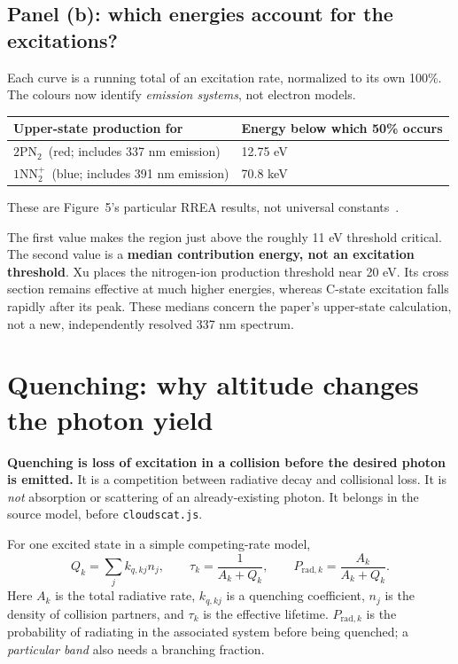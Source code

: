 \documentclass[11pt,a4paper]{article}
\newcommand{\TwoP}{\ensuremath{2\mathrm{P}\mathrm{N}_2}}
\newcommand{\OneN}{\ensuremath{1\mathrm{N}\mathrm{N}_2^{+}}}
\newcommand{\xu}[1]{\cite[#1]{Xu2015}}
\newcommand{\source}[1]{{\small\color{muted}#1}\par}
\newcommand{\nextsection}[1]{\clearpage\section{#1}}
\begin{document}
\subsection*{Panel (b): which energies account for the excitations?}
Each curve is a running total of an excitation rate, normalized to its own 100\%. The colours now identify \emph{emission systems}, not electron models.
\begin{center}
\begin{tabularx}{\textwidth}{@{}Y P{40mm}@{}}
\toprule
\textbf{Upper-state production for} & \textbf{Energy below which 50\% occurs}\\
\midrule
\TwoP\ (red; includes 337 nm emission) & 12.75 eV\\
\OneN\ (blue; includes 391 nm emission) & 70.8 keV\\
\bottomrule
\end{tabularx}
\end{center}
\source{These are Figure~5's particular RREA results, not universal constants~\cite{Xu2015}.}
The first value makes the region just above the roughly 11 eV threshold critical. The second value is a \textbf{median contribution energy, not an excitation threshold}. Xu places the nitrogen-ion production threshold near 20 eV. Its cross section remains effective at much higher energies, whereas C-state excitation falls rapidly after its peak. These medians concern the paper's upper-state calculation, not a new, independently resolved 337 nm spectrum.\xu{Secs.~3.2.1 and 3.3}

\nextsection{Quenching: why altitude changes the photon yield}
\label{sec:quench}
\textbf{Quenching is loss of excitation in a collision before the desired photon is emitted.} It is a competition between radiative decay and collisional loss. It is \emph{not} absorption or scattering of an already-existing photon. It belongs in the source model, before \texttt{cloudscat.js}.\xu{Sec.~2.2}

For one excited state in a simple competing-rate model,
\begin{equation}
 Q_k=\sum_j k_{q,kj}n_j,\qquad
 \tau_k=\frac{1}{A_k+Q_k},\qquad
 P_{\mathrm{rad},k}=\frac{A_k}{A_k+Q_k}.
 \label{eq:quench}
\end{equation}
Here $A_k$ is the total radiative rate, $k_{q,kj}$ is a quenching coefficient, $n_j$ is the density of collision partners, and $\tau_k$ is the effective lifetime. $P_{\mathrm{rad},k}$ is the probability of radiating in the associated system before being quenched; a \emph{particular band} also needs a branching fraction.
\end{document}
